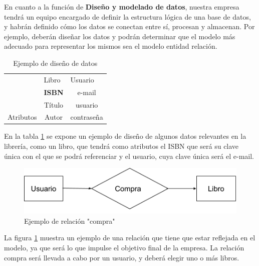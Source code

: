 \documentclass{article}
\begin{document}
En cuanto a la función de \textbf{Diseño y modelado de datos}, nuestra empresa tendrá un equipo encargado de definir la estructura lógica de una base de datos, y habrán definido cómo los datos se conectan entre sí, procesan y almacenan. Por ejemplo, deberán diseñar los datos y podrán determinar que el modelo más adecuado para representar los mismos sea el modelo entidad relación.
\begin{table}[h]
	\centering
	\begin{tabular}{lcc}
		\rowcolor[HTML]{3531FF} 
		\cellcolor[HTML]{FFFFFF}                            & \multicolumn{1}{l}{\cellcolor[HTML]{3531FF}Libro} & \multicolumn{1}{l}{\cellcolor[HTML]{3531FF}Usuario} \\
		\cellcolor[HTML]{3166FF}                            & \textbf{ISBN}                                     & e-mail                                              \\
		\cellcolor[HTML]{3166FF}                            & Título                                            & usuario                                             \\
		\multirow{-3}{*}{\cellcolor[HTML]{3166FF}Atributos} & Autor                                             & contraseña                                         
	\end{tabular}
	\caption{Ejemplo de diseño de datos}
	\label{tdiseno}
\end{table}

En la tabla \ref{tdiseno} se expone un ejemplo de diseño de algunos datos relevantes en la librería, como un libro, que tendrá como atributos el ISBN que será su clave única con el que se podrá referenciar y el usuario, cuya clave única será el e-mail.

\begin{figure}[h]
	\centering
	\includegraphics[width=0.7\linewidth]{er}
	\caption{Ejemplo de relación "compra"}
	\label{fig:er}
\end{figure}

La figura \ref{fig:er} muestra un ejemplo de una relación que tiene que estar reflejada en el modelo, ya que será lo que impulse el objetivo final de la empresa. La relación compra será llevada a cabo por un usuario, y deberá elegir uno o más libros.
\end{document}
